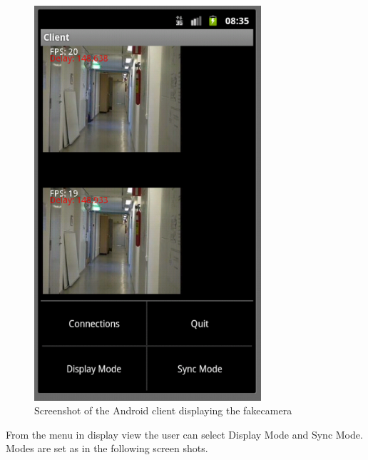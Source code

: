 \documentclass[8pt,titlepage]{article}
\begin{document}
\begin{figure}[hbp]
\includegraphics[width=0.75\textwidth]{../screenshots/androidDisplaying.png}
\caption{Screenshot of the Android client displaying the fakecamera}
\end{figure}

From the menu in display view the user can select Display Mode and Sync Mode. Modes are set as in the following screen shots.
\end{document}
